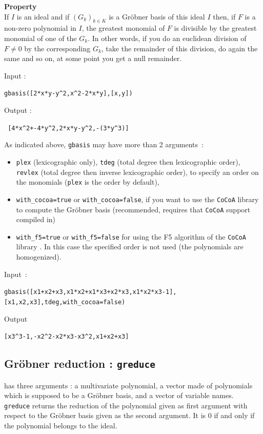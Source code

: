 \documentclass[a4paper,11pt]{book}
\begin{document}
{\bf Property}\\
If $I$ is an ideal and if $(G_k)_{k \in K}$ is a Gr\"obner basis of this 
ideal $I$ then, if $F$ is a non-zero polynomial in $I$, the greatest monomial 
of $F$ is divisible by the greatest monomial of one of the $G_k$.
In other words, if you do an euclidean division of $F\neq 0$ 
by the corresponding $G_k$, take the remainder of this division, do
again the same and so on, at some point you get a null remainder.
  
Input :
\begin{center}{\tt gbasis([2*x*y-y\verb|^|2,x\verb|^|2-2*x*y],[x,y])}
\end{center}
Output :
\begin{center}{\tt
 [4*x\verb|^|2+-4*y\verb|^|2,2*x*y-y\verb|^|2,-(3*y\verb|^|3)]}
\end{center}

As indicated above, {\tt gbasis} may have more than 2 arguments~:
\begin{itemize}
\item {\tt plex} (lexicographic only), {\tt tdeg} (total degree then
lexicographic order),
{\tt revlex} (total degree then inverse lexicographic order), to
specify an order on the monomials 
({\tt plex} is the order by default),
\item {\tt with\_cocoa=true} or {\tt with\_cocoa=false}, if you want to use
the {\tt CoCoA} library to compute the Gr\"obner basis (recommended,
requires that {\tt CoCoA} support compiled in)

\item {\tt with\_f5=true} or {\tt with\_f5=false} for using the F5 algorithm
of the {\tt CoCoA} library .
In this case the  specified order is not used (the polynomials are 
homogenized).
\end{itemize}
Input~:
\begin{center}
{\tt gbasis([x1+x2+x3,x1*x2+x1*x3+x2*x3,x1*x2*x3-1], [x1,x2,x3],tdeg,with\_cocoa=false)}
\end{center}
Output
\begin{center}
\verb|[x3^3-1,-x2^2-x2*x3-x3^2,x1+x2+x3]|
\end{center}

\subsection{Gr\"obner reduction : {\tt greduce}}
 has three arguments : a multivariate
polynomial, 
a vector made of polynomials which is supposed to be a Gr\"obner
basis,  and a vector of variable names.\\
{\tt greduce} returns the reduction of 
the polynomial given as first argument
with respect to the Gr\"obner basis given as the second argument.
It is 0 if and only if the polynomial belongs to the ideal.
\end{document}

